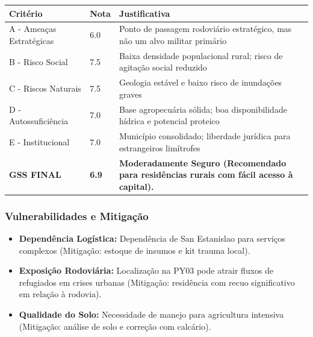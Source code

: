 \begin{table}[ht!]
\small \begin{tabular}{p{3.0cm}p{0.8cm}p{6.0cm}} \toprule
\textbf{Critério} & \textbf{Nota} & \textbf{Justificativa} \\ \midrule
A - Ameaças Estratégicas & 6.0 & Ponto de passagem rodoviário estratégico, mas não um alvo militar primário \\
B - Risco Social & 7.5 & Baixa densidade populacional rural; risco de agitação social reduzido \\
C - Riscos Naturais & 7.5 & Geologia estável e baixo risco de inundações graves \\
D - Autossuficiência & 7.0 & Base agropecuária sólida; boa disponibilidade hídrica e potencial proteico \\
E - Institucional & 7.0 & Município consolidado; liberdade jurídica para estrangeiros limítrofes \\
\midrule \textbf{GSS FINAL} & \textbf{6.9} & \textbf{Moderadamente Seguro (Recomendado para residências rurais com fácil acesso à capital).} \\ \bottomrule \end{tabular}
\end{table}
\subsubsection{Vulnerabilidades e
Mitigação}

\begin{itemize}
\tightlist
\item
  \textbf{Dependência Logística:} Dependência de San Estanislao para
  serviços complexos (Mitigação: estoque de insumos e kit trauma local).
\item
  \textbf{Exposição Rodoviária:} Localização na PY03 pode atrair fluxos
  de refugiados em crises urbanas (Mitigação: residência com recuo
  significativo em relação à rodovia).
\item
  \textbf{Qualidade do Solo:} Necessidade de manejo para agricultura
  intensiva (Mitigação: análise de solo e correção com calcário).
\end{itemize}

